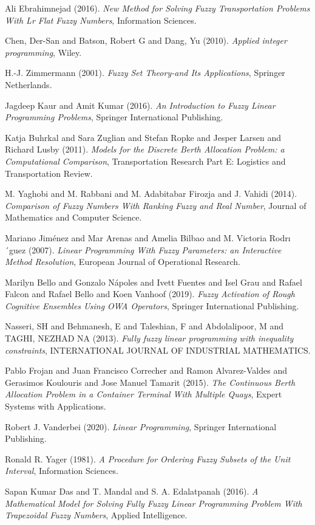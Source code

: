\documentclass[11pt,a4paper,final]{article}
\begin{document}
\noindent
Ali Ebrahimnejad (2016). \emph{New Method for Solving Fuzzy Transportation Problems With Lr Flat Fuzzy Numbers}, Information Sciences.

\noindent
Chen, Der-San and Batson, Robert G and Dang, Yu (2010). \emph{Applied integer programming}, Wiley.

\noindent
H.-J. Zimmermann (2001). \emph{Fuzzy Set Theory-and Its Applications}, Springer Netherlands.

\noindent
Jagdeep Kaur and Amit Kumar (2016). \emph{An Introduction to Fuzzy Linear Programming Problems}, Springer International Publishing.

\noindent
Katja Buhrkal and Sara Zuglian and Stefan Ropke and Jesper Larsen and Richard Lusby (2011). \emph{Models for the Discrete Berth Allocation Problem: a Computational Comparison}, Transportation Research Part E: Logistics and Transportation Review.

\noindent
M. Yaghobi and M. Rabbani and M. Adabitabar Firozja and J. Vahidi (2014). \emph{Comparison of Fuzzy Numbers With Ranking Fuzzy and Real Number}, Journal of Mathematics and Computer Science.

\noindent
Mariano Jim{\'e}nez and Mar Arenas and Amelia Bilbao and M. Victoria Rodrı´guez (2007). \emph{Linear Programming With Fuzzy Parameters: an Interactive Method Resolution}, European Journal of Operational Research.

\noindent
Marilyn Bello and Gonzalo N{\'a}poles and Ivett Fuentes and Isel Grau and Rafael Falcon and Rafael Bello and Koen Vanhoof (2019). \emph{Fuzzy Activation of Rough Cognitive Ensembles Using OWA Operators}, Springer International Publishing.

\noindent
Nasseri, SH and Behmanesh, E and Taleshian, F and Abdolalipoor, M and TAGHI, NEZHAD NA (2013). \emph{Fully fuzzy linear programming with inequality constraints}, INTERNATIONAL JOURNAL OF INDUSTRIAL MATHEMATICS.

\noindent
Pablo Frojan and Juan Francisco Correcher and Ramon Alvarez-Valdes and Gerasimos Koulouris and Jose Manuel Tamarit (2015). \emph{The Continuous Berth Allocation Problem in a Container Terminal With Multiple Quays}, Expert Systems with Applications.

\noindent
Robert J. Vanderbei (2020). \emph{Linear Programming}, Springer International Publishing.

\noindent
Ronald R. Yager (1981). \emph{A Procedure for Ordering Fuzzy Subsets of the Unit Interval}, Information Sciences.

\noindent
Sapan Kumar Das and T. Mandal and S. A. Edalatpanah (2016). \emph{A Mathematical Model for Solving Fully Fuzzy Linear Programming Problem With Trapezoidal Fuzzy Numbers}, Applied Intelligence.
\end{document}
